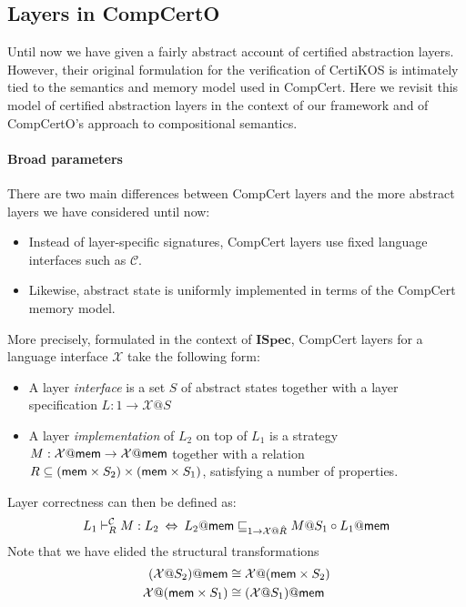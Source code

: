 \documentclass[sigplan,10pt,authordraft]{acmart}
\newcommand{\ISpec}{\mathbf{ISpec}}
\begin{document}

\subsection{Layers in CompCertO} %

Until now we have given a fairly abstract account of
certified abstraction layers.
However, their original formulation
for the verification of CertiKOS \cite{popl15}
is intimately tied to the semantics and memory model
used in CompCert.
Here we revisit this model of certified abstraction layers
in the context of our framework and
of CompCertO's approach to compositional semantics.

\paragraph{Broad parameters} %

There are two main differences between
CompCert layers and
the more abstract layers
we have considered until now:
\begin{itemize}
  \item Instead of layer-specific signatures,
    CompCert layers use fixed language interfaces
    such as $\mathcal{C}$.
  \item Likewise, abstract state is uniformly implemented
    in terms of the CompCert memory model.
\end{itemize}
More precisely,
formulated in the context of $\ISpec$,
CompCert layers for a language interface $\mathcal{X}$
take the following form:
\begin{itemize}
  \item A layer \emph{interface}
    is a set $S$ of abstract states
    together with a layer specification
    $L : 1 \rightarrow \mathcal{X}@S$
  \item A layer \emph{implementation}
    of $L_2$ on top of $L_1$
    is a strategy
    $M : \mathcal{X}@ \mathsf{mem}  \rightarrow \mathcal{X}@ \mathsf{mem} $
    together with a relation
    $R \subseteq ( \mathsf{mem}  \times S_2) \times ( \mathsf{mem}  \times S_1)$,
    satisfying a number of properties.
\end{itemize}
Layer correctness can then be defined as:
\[
  L_1 \vdash_R^\mathcal{C} M : L_2
  \:\Leftrightarrow\:
  L_2@ \mathsf{mem}  \sqsubseteq_{1 \rightarrow \mathcal{X}@\hat{R}}
  M@S_1 \circ L_1@ \mathsf{mem} 
\]
Note that we have elided the structural transformations
\begin{align*}
  (\mathcal{X}@S_2)@ \mathsf{mem} 
  &\cong
  \mathcal{X}@( \mathsf{mem}  \times S_2)
  \\
  \mathcal{X}@( \mathsf{mem}  \times S_1)
  &\cong
  (\mathcal{X}@S_1)@ \mathsf{mem} 
\end{align*}
\end{document}
